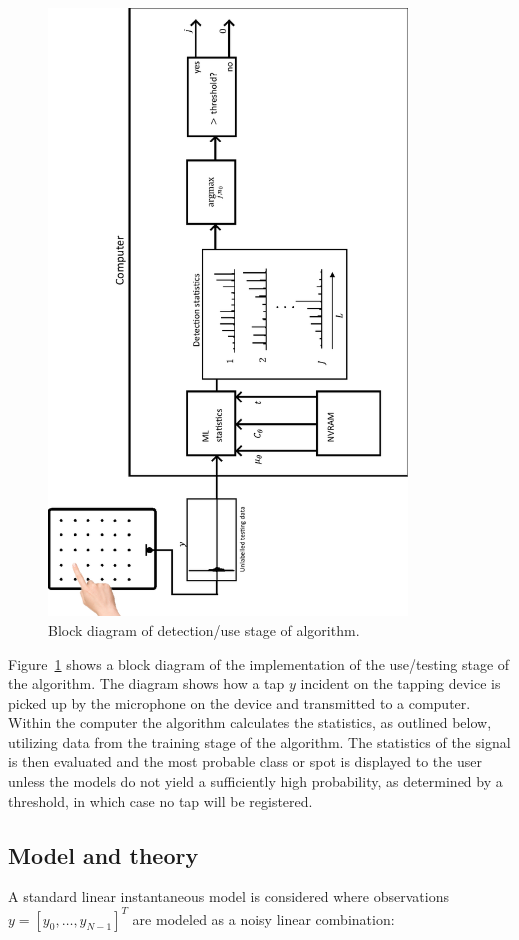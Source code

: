 \begin{figure}[!]
\centering
\includegraphics[width=360px]{testingSystemPlot.pdf}
\caption{Block diagram of detection/use stage of algorithm.}\label{fig:testingSystemPlot}
\end{figure}

Figure~\ref{fig:testingSystemPlot} shows a block diagram of the implementation of the use/testing stage of the algorithm. The diagram shows how a tap $y$ incident on the tapping device is picked up by the microphone on the device and transmitted to a computer. Within the computer the algorithm calculates the statistics, as outlined below, utilizing data from the training stage of the algorithm. The statistics of the signal is then evaluated and the most probable class or spot is displayed to the user unless the models do not yield a sufficiently high probability, as determined by a threshold, in which case no tap will be registered.

\subsection{Model and theory}
A standard linear instantaneous model is considered where observations \linebreak[0]$y = [y_0, \ldots , y_{N-1}]^T $ are modeled as a noisy linear combination:

